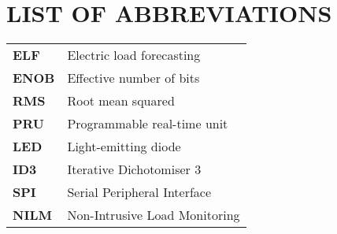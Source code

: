 
\section*{LIST OF ABBREVIATIONS}

\begin{tabular}{p{3cm}l}
  \textbf{ELF}          &  Electric load forecasting \\
  \textbf{ENOB}         &  Effective number of bits \\
  \textbf{RMS}          &  Root mean squared \\
  \textbf{PRU}          &  Programmable real-time unit \\
  \textbf{LED}          &  Light-emitting diode \\
  \textbf{ID3}          &  Iterative Dichotomiser 3 \\
  \textbf{SPI}          &  Serial Peripheral Interface \\
  \textbf{NILM}         &  Non-Intrusive Load Monitoring \\
  
\end{tabular}

